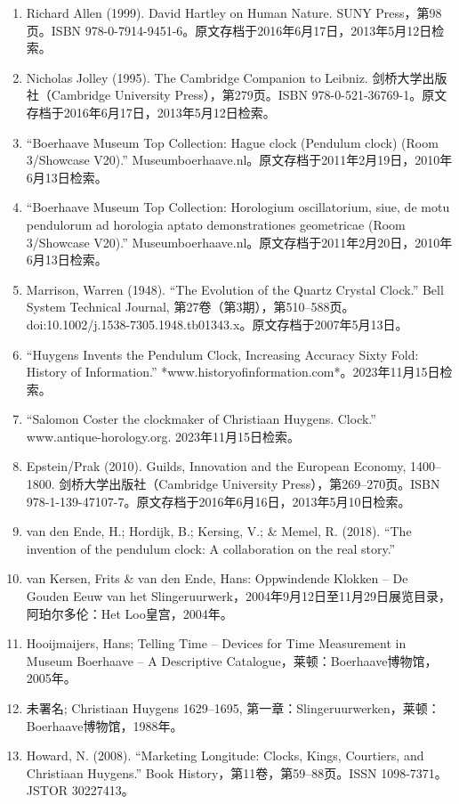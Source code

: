 \begin{enumerate}
\item Richard Allen (1999). David Hartley on Human Nature. SUNY Press，第98页。ISBN 978-0-7914-9451-6。原文存档于2016年6月17日，2013年5月12日检索。
\item Nicholas Jolley (1995). The Cambridge Companion to Leibniz. 剑桥大学出版社（Cambridge University Press），第279页。ISBN 978-0-521-36769-1。原文存档于2016年6月17日，2013年5月12日检索。
\item “Boerhaave Museum Top Collection: Hague clock (Pendulum clock) (Room 3/Showcase V20).” Museumboerhaave.nl。原文存档于2011年2月19日，2010年6月13日检索。
\item “Boerhaave Museum Top Collection: Horologium oscillatorium, siue, de motu pendulorum ad horologia aptato demonstrationes geometricae (Room 3/Showcase V20).” Museumboerhaave.nl。原文存档于2011年2月20日，2010年6月13日检索。
\item Marrison, Warren (1948). “The Evolution of the Quartz Crystal Clock.” Bell System Technical Journal, 第27卷（第3期），第510–588页。doi:10.1002/j.1538-7305.1948.tb01343.x。原文存档于2007年5月13日。
\item “Huygens Invents the Pendulum Clock, Increasing Accuracy Sixty Fold: History of Information.” *www.historyofinformation.com*。2023年11月15日检索。
\item “Salomon Coster the clockmaker of Christiaan Huygens. Clock.” www.antique-horology.org. 2023年11月15日检索。
\item Epstein/Prak (2010). Guilds, Innovation and the European Economy, 1400–1800. 剑桥大学出版社（Cambridge University Press），第269–270页。ISBN 978-1-139-47107-7。原文存档于2016年6月16日，2013年5月10日检索。
\item van den Ende, H.; Hordijk, B.; Kersing, V.; & Memel, R. (2018). “The invention of the pendulum clock: A collaboration on the real story.”
\item van Kersen, Frits & van den Ende, Hans: Oppwindende Klokken – De Gouden Eeuw van het Slingeruurwerk，2004年9月12日至11月29日展览目录，阿珀尔多伦：Het Loo皇宫，2004年。
\item Hooijmaijers, Hans; Telling Time – Devices for Time Measurement in Museum Boerhaave – A Descriptive Catalogue，莱顿：Boerhaave博物馆，2005年。
\item 未署名; Christiaan Huygens 1629–1695, 第一章：Slingeruurwerken，莱顿：Boerhaave博物馆，1988年。
\item Howard, N. (2008). “Marketing Longitude: Clocks, Kings, Courtiers, and Christiaan Huygens.” Book History，第11卷，第59–88页。ISSN 1098-7371。JSTOR 30227413。

\end{enumerate}
